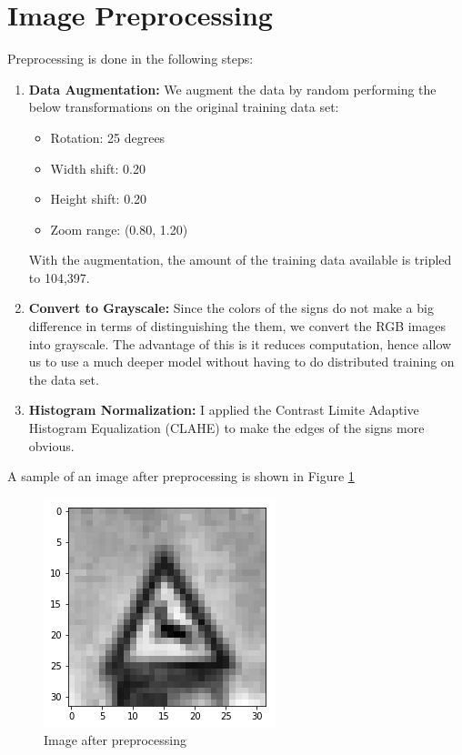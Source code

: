 \documentclass[12pt,twoside]{article}
\begin{document}
\section{Image Preprocessing}
Preprocessing is done in the following steps:
\begin{enumerate}
	\item \textbf{Data Augmentation:} We augment the data by random performing the below transformations on the original training data set:
		\begin{itemize}
			\item Rotation: 25 degrees
			\item Width shift: 0.20
			\item Height shift: 0.20
			\item Zoom range: (0.80, 1.20)
		\end{itemize}
	With the augmentation, the amount of the training data available is tripled to 104,397.
	\item \textbf{Convert to Grayscale:} Since the colors of the signs do not make a big difference in terms of distinguishing the them, we convert the RGB images into grayscale. The advantage of this is it reduces computation, hence allow us to use a much deeper model without having to do distributed training on the data set.
	\item \textbf{Histogram Normalization:} I applied the Contrast Limite Adaptive Histogram Equalization (CLAHE) to make the edges of the signs more obvious.
\end{enumerate}

A sample of an image after preprocessing is shown in Figure \ref{fig:preprocessing}
\begin{figure}[H]
	\begin{center}
		\includegraphics[width = 0.4\hsize]{./figures/Preprocessing.png} 
		\caption{Image after preprocessing} %
		\label{fig:preprocessing} %
	\end{center}
\end{figure}
\end{document}
